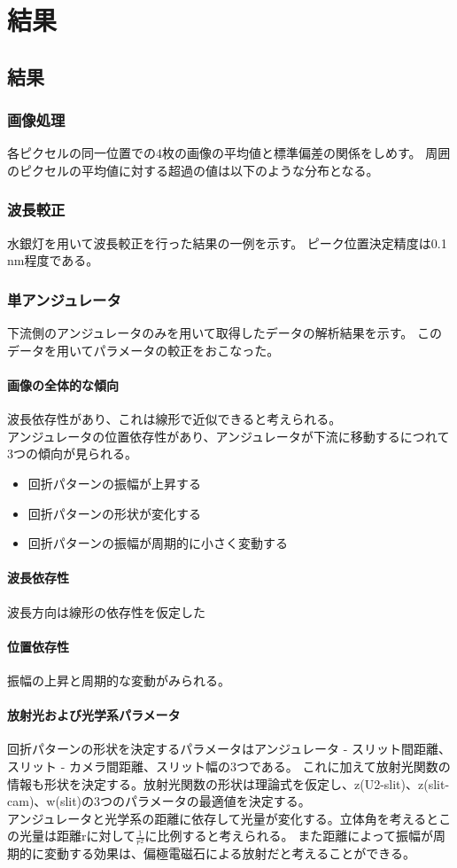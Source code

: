 \documentclass[a4paper,11pt,uplatex]{jsbook}
\begin{document}
\chapter{結果}
\section{結果}
\subsection{画像処理}
各ピクセルの同一位置での4枚の画像の平均値と標準偏差の関係をしめす。
周囲のピクセルの平均値に対する超過の値は以下のような分布となる。
\subsection{波長較正}
水銀灯を用いて波長較正を行った結果の一例を示す。
ピーク位置決定精度は0.1 nm程度である。

\subsection{単アンジュレータ}
下流側のアンジュレータのみを用いて取得したデータの解析結果を示す。
このデータを用いてパラメータの較正をおこなった。
\subsubsection{画像の全体的な傾向}
波長依存性があり、これは線形で近似できると考えられる。\\
アンジュレータの位置依存性があり、アンジュレータが下流に移動するにつれて3つの傾向が見られる。
\begin{itemize}
  \item 回折パターンの振幅が上昇する
  \item 回折パターンの形状が変化する
  \item 回折パターンの振幅が周期的に小さく変動する
\end{itemize}
\subsubsection{波長依存性}
波長方向は線形の依存性を仮定した
\subsubsection{位置依存性}
振幅の上昇と周期的な変動がみられる。
\subsubsection{放射光および光学系パラメータ}
回折パターンの形状を決定するパラメータはアンジュレータ - スリット間距離、スリット - カメラ間距離、スリット幅の3つである。
これに加えて放射光関数の情報も形状を決定する。放射光関数の形状は理論式を仮定し、z(U2-slit)、z(slit-cam)、w(slit)の3つのパラメータの最適値を決定する。\\
アンジュレータと光学系の距離に依存して光量が変化する。立体角を考えるとこの光量は距離rに対して$\frac{1}{r^2}$に比例すると考えられる。
また距離によって振幅が周期的に変動する効果は、偏極電磁石による放射だと考えることができる。
\end{document}
